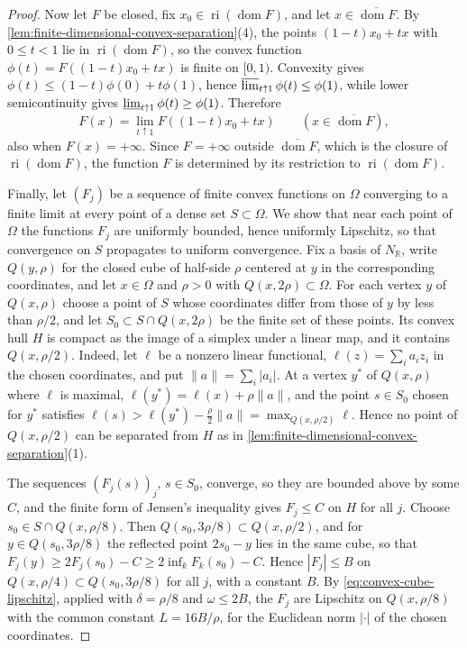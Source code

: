 \begin{proof}
Now let $F$ be closed, fix $x_0\in\operatorname{ri}(\operatorname{dom}F)$, and let $x\in\overline{\operatorname{dom}F}$. By \cref{lem:finite-dimensional-convex-separation}(4), the points $(1-t)x_0+tx$ with $0\leq t<1$ lie in $\operatorname{ri}(\operatorname{dom}F)$, so the convex function $\phi(t)=F((1-t)x_0+tx)$ is finite on $[0,1)$. Convexity gives $\phi(t)\leq(1-t)\phi(0)+t\phi(1)$, hence $\varlimsup_{t\uparrow1}\phi(t)\leq\phi(1)$, while lower semicontinuity gives $\varliminf_{t\uparrow1}\phi(t)\geq\phi(1)$. Therefore
\[
 F(x)=\lim_{t\uparrow1}F((1-t)x_0+tx)
                           \qquad(x\in\overline{\operatorname{dom}F}),
\]
also when $F(x)=+\infty$. Since $F=+\infty$ outside $\overline{\operatorname{dom}F}$, which is the closure of $\operatorname{ri}(\operatorname{dom}F)$, the function $F$ is determined by its restriction to $\operatorname{ri}(\operatorname{dom}F)$.

Finally, let $(F_j)$ be a sequence of finite convex functions on $\Omega$ converging to a finite limit at every point of a dense set $S\subset\Omega$. We show that near each point of $\Omega$ the functions $F_j$ are uniformly bounded, hence uniformly Lipschitz, so that convergence on $S$ propagates to uniform convergence. Fix a basis of $N_{\mathbb R}$, write $Q(y,\rho)$ for the closed cube of half-side $\rho$ centered at $y$ in the corresponding coordinates, and let $x\in\Omega$ and $\rho>0$ with $Q(x,2\rho)\subset\Omega$. For each vertex $y$ of $Q(x,\rho)$ choose a point of $S$ whose coordinates differ from those of $y$ by less than $\rho/2$, and let $S_0\subset S\cap Q(x,2\rho)$ be the finite set of these points. Its convex hull $H$ is compact as the image of a simplex under a linear map, and it contains $Q(x,\rho/2)$. Indeed, let $\ell$ be a nonzero linear functional, $\ell(z)=\sum_ia_iz_i$ in the chosen coordinates, and put $\|a\|=\sum_i|a_i|$. At a vertex $y^*$ of $Q(x,\rho)$ where $\ell$ is maximal, $\ell(y^*)=\ell(x)+\rho\|a\|$, and the point $s\in S_0$ chosen for $y^*$ satisfies $\ell(s)>\ell(y^*)-\frac\rho2\|a\|=\max_{Q(x,\rho/2)}\ell$. Hence no point of $Q(x,\rho/2)$ can be separated from $H$ as in \cref{lem:finite-dimensional-convex-separation}(1).

The sequences $(F_j(s))_j$, $s\in S_0$, converge, so they are bounded above by some $C$, and the finite form of Jensen's inequality gives $F_j\leq C$ on $H$ for all $j$. Choose $s_0\in S\cap Q(x,\rho/8)$. Then $Q(s_0,3\rho/8)\subset Q(x,\rho/2)$, and for $y\in Q(s_0,3\rho/8)$ the reflected point $2s_0-y$ lies in the same cube, so that $F_j(y)\geq2F_j(s_0)-C\geq2\inf_kF_k(s_0)-C$. Hence $|F_j|\leq B$ on $Q(x,\rho/4)\subset Q(s_0,3\rho/8)$ for all $j$, with a constant $B$. By \eqref{eq:convex-cube-lipschitz}, applied with $\delta=\rho/8$ and $\omega\leq2B$, the $F_j$ are Lipschitz on $Q(x,\rho/8)$ with the common constant $L=16B/\rho$, for the Euclidean norm $|\cdot|$ of the chosen coordinates.


\end{proof}
